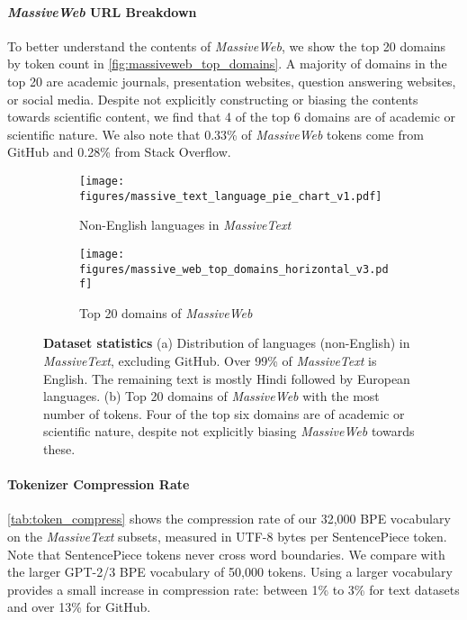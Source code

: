 \documentclass[11pt, a4paper, logo, internal, copyright, nonumbering]{deepmind}
\newcommand{\massivetext}{\textit{MassiveText}\xspace}
\newcommand{\massiveweb}{\textit{MassiveWeb}\xspace}
\begin{document}
\paragraph{\massiveweb URL Breakdown} To better understand the contents of \massiveweb, we show the top 20 domains by token count in \autoref{fig:massiveweb_top_domains}.
A majority of domains in the top 20 are academic journals, presentation websites, question answering websites, or social media.
Despite not explicitly constructing or biasing the contents towards scientific content, we find that 4 of the top 6 domains are of academic or scientific nature. We also note that 0.33\% of \massiveweb tokens come from GitHub and 0.28\% from Stack Overflow.

\begin{figure}[H]
\begin{subfigure}[b]{.5\textwidth}
    \centering
    \captionsetup{width=.8\linewidth}
    \texttt{[image: figures/massive\_text\_language\_pie\_chart\_v1.pdf]}
    \caption{Non-English languages in \massivetext}
    \label{fig:massive-text-languages}
\end{subfigure}
\begin{subfigure}[b]{.5\textwidth}
    \centering
    \captionsetup{width=.8\linewidth}
    \texttt{[image: figures/massive\_web\_top\_domains\_horizontal\_v3.pdf]}
    \caption{Top 20 domains of \massiveweb}
    \label{fig:massiveweb_top_domains}
\end{subfigure}
\label{fig:dataset_statistics}
\caption{
\textbf{Dataset statistics}
(a) Distribution of languages (non-English) in \massivetext,  excluding GitHub. Over 99\% of \massivetext is English. The remaining text is mostly Hindi followed by European languages.
(b) Top 20 domains of \massiveweb with the most number of tokens. Four of the top six domains are of academic or scientific nature, despite not explicitly biasing \massiveweb towards these.} 
\end{figure}

\paragraph{Tokenizer Compression Rate}
\autoref{tab:token_compress} shows the compression rate of our 32,000 BPE vocabulary on the \massivetext subsets, measured in UTF-8 bytes per SentencePiece token. Note that SentencePiece tokens never cross word boundaries. We compare with the larger GPT-2/3 BPE vocabulary of 50,000 tokens. Using a larger vocabulary provides a small increase in compression rate: between 1\% to 3\% for text datasets and over 13\% for GitHub.
\end{document}
